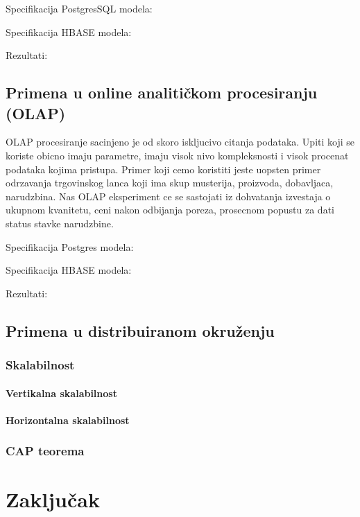 \documentclass[12pt,oneside]{memoir}
\begin{document}
Specifikacija PostgresSQL modela:

Specifikacija HBASE modela:

Rezultati:

\section{Primena u online analitičkom procesiranju (OLAP)}

OLAP procesiranje sacinjeno je od skoro iskljucivo citanja podataka. Upiti koji se koriste obicno imaju parametre, imaju visok nivo kompleksnosti i visok procenat podataka kojima pristupa.
Primer koji cemo koristiti jeste uopsten primer odrzavanja trgovinskog lanca koji ima skup musterija, proizvoda, dobavljaca,  narudzbina. 
Nas OLAP eksperiment ce se sastojati iz dohvatanja izvestaja o ukupnom kvanitetu, ceni nakon odbijanja poreza, prosecnom popustu za dati status stavke narudzbine.


Specifikacija Postgres modela:

Specifikacija HBASE modela:

Rezultati:

\section{Primena u distribuiranom okruženju}
\subsection{Skalabilnost}
\subsubsection{Vertikalna skalabilnost}
\subsubsection{Horizontalna skalabilnost}
\subsection{CAP teorema}

\chapter{Zaključak}

\literatura
\end{document}
